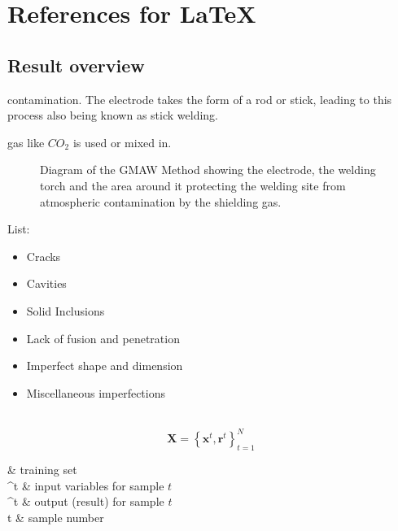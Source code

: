 \chapter{References for \LaTeX} %
\section{Result overview}
    
contamination.  The electrode takes the form of a rod or stick, leading to this process also being known as stick welding.

gas like \(CO_2\) is used or mixed in. 

    
\begin{figure}[!h]
    \centering
    \caption{Diagram of the GMAW Method showing the electrode, the welding torch and the area around it protecting the welding site from atmospheric contamination by the shielding gas. }
    \label{fig:gmaw_nozzle}
\end{figure}
    


List:


\begin{itemize}
    \item Cracks
    \item Cavities
    \item Solid Inclusions
    \item Lack of fusion and penetration
    \item Imperfect shape and dimension
    \item Miscellaneous imperfections
\end{itemize}



\HRule\\

    
\begin{equation}
    \mathbf{X} = \left\lbrace \mathbf{x}^t,\mathbf{r}^t \right\rbrace_{t=1}^N\
    \label{eq:dataset}
\end{equation}

\begin{conditions}
     & training set\\
    ^t & input variables for sample \(t\) \\
    ^t & output (result) for sample \(t\) \\
    t & sample number\\
\end{conditions}

